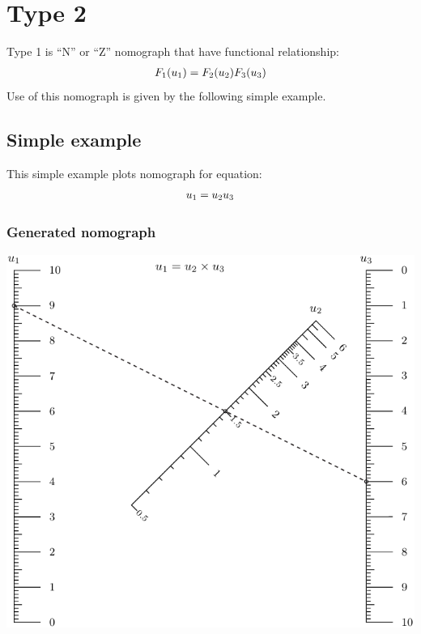 \documentclass[a4paper,11pt,english]{sphinxmanual}
\begin{document}
\section{Type 2}
\label{types/types:type2-ref}\label{types/types:type-2}
Type 1 is ``N'' or ``Z'' nomograph that have functional relationship:
\begin{gather}
\begin{split}F_1(u_1) = F_2(u_2) F_3(u_3)\end{split}\notag
\end{gather}
Use of this nomograph is given by the following
simple example.


\subsection{Simple example}
\label{types/types:id3}
This simple example plots nomograph for equation:
\begin{gather}
\begin{split}u_1 = u_2 u_3\end{split}\notag
\end{gather}

\subsubsection{Generated nomograph}
\label{types/types:id4}
\includegraphics{ex_type2_nomo_1.pdf}
\end{document}
